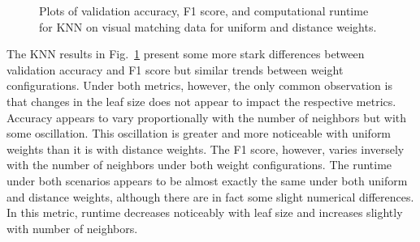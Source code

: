 \documentclass[12pt]{uthesis-v12}  %
\begin{document}
\begin{figure}
	\hfill	
{}
						
\caption{Plots of validation accuracy, F1 score, and computational runtime for KNN on visual matching data for uniform and distance weights.}
	\label{knn-vismatch}
	\end{figure}
	
The KNN results in Fig.~\ref{knn-vismatch} present some more stark differences between validation accuracy and F1 score but similar trends between weight configurations. Under both metrics, however, the only common observation is that changes in the leaf size does not appear to impact the respective metrics. Accuracy appears to vary proportionally with the number of neighbors but with some oscillation. This oscillation is greater and more noticeable with uniform weights than it is with distance weights. The F1 score, however, varies inversely with the number of neighbors under both weight configurations. The runtime under both scenarios appears to be almost exactly the same under both uniform and distance weights, although there are in fact some slight numerical differences. In this metric, runtime decreases noticeably with leaf size and increases slightly with number of neighbors.
\end{document}
